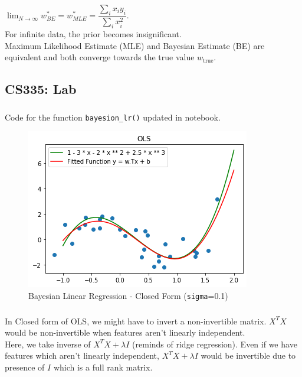 \documentclass[12pt, fleqn]{article}
\begin{document}
\subsubsection{}
$\lim_{N \to \infty} w^*_{BE} = w^*_{MLE} = \dfrac{\sum_i x_i y_i}{\sum_i x_i^2}$. \\
For infinite data, the prior becomes insignificant. \\
Maximum Likelihood Estimate (MLE) and Bayesian Estimate (BE) are equivalent and both converge towards the true value $w_{\text{true}}$.

\subsection{CS335: Lab}
\subsubsection{}
Code for the function \verb!bayesion_lr()! updated in notebook.
\begin{figure}[H]
  \centering
  \includegraphics[scale=0.7]{bayesion_lr.png}
  \caption{Bayesian Linear Regression - Closed Form (\texttt{sigma}=0.1)}
\end{figure}

\subsubsection{}
In Closed form of OLS, we might have to invert a non-invertible matrix. $X^T X$ would be non-invertible when features aren't linearly independent. \\
Here, we take inverse of $X^T X + \lambda I$ (reminds of ridge regression). Even if we have features which aren't linearly independent, $X^T X + \lambda I$ would be invertible due to presence of $I$ which is a full rank matrix.
\end{document}
